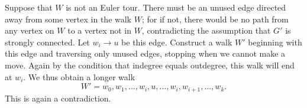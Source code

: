 \documentclass[12pt]{article}
\begin{document}
\begin{enumerate}[(a)]
{        Suppose that $W$ is not an Euler tour. 
        There must be an unused edge directed away from some vertex in the walk $W$; for if not, there would be no path from any vertex on $W$ to a vertex not in $W$, contradicting the assumption that $G'$ is strongly connected.  
        Let $w_i \to u$ be this edge. Construct a walk $W'$ beginning with this edge and traversing only unused edges, stopping when we cannot make a move. Again by the condition that indegree equals outdegree, this walk will end at $w_i$. We thus obtain a longer walk 
        \[ W' = w_0, w_1, \ldots, w_i, u, \ldots, w_i, w_{i+1}, \ldots, w_k. \]
        This is again a contradiction.

    }

%
%        
%

\end{enumerate}
\end{document}
